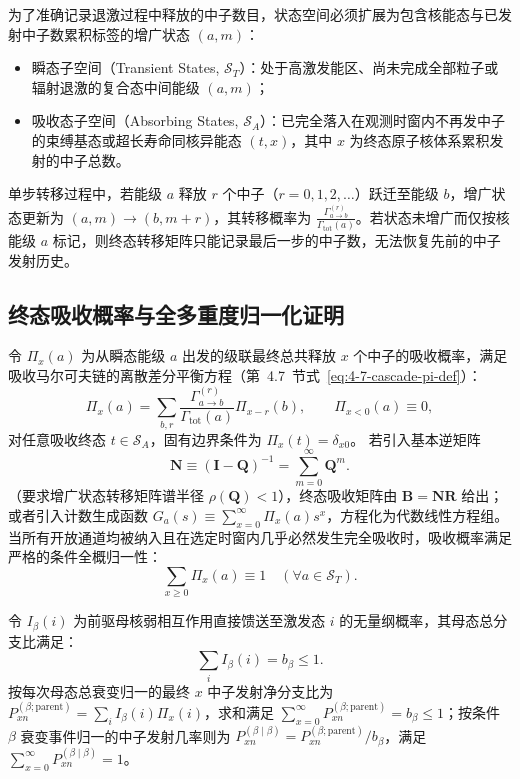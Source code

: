 为了准确记录退激过程中释放的中子数目，状态空间必须扩展为包含核能态与已发射中子数累积标签的增广状态 $(a, m)$：
\begin{itemize}
\item 瞬态子空间（Transient States, $\mathcal{S}_T$）：处于高激发能区、尚未完成全部粒子或辐射退激的复合态中间能级 $(a, m)$；
\item 吸收态子空间（Absorbing States, $\mathcal{S}_A$）：已完全落入在观测时窗内不再发中子的束缚基态或超长寿命同核异能态 $(t, x)$，其中 $x$ 为终态原子核体系累积发射的中子总数。
\end{itemize}
单步转移过程中，若能级 $a$ 释放 $r$ 个中子（$r = 0, 1, 2, \dots$）跃迁至能级 $b$，增广状态更新为 $(a, m) \to (b, m + r)$，其转移概率为 $\frac{\Gamma^{(r)}_{a \to b}}{\Gamma_{\mathrm{tot}}(a)}$。若状态未增广而仅按核能级 $a$ 标记，则终态转移矩阵只能记录最后一步的中子数，无法恢复先前的中子发射历史。

\subsection{终态吸收概率与全多重度归一化证明}

令 $\Pi_x(a)$ 为从瞬态能级 $a$ 出发的级联最终总共释放 $x$ 个中子的吸收概率，满足吸收马尔可夫链的离散差分平衡方程（第~4.7~节式~\eqref{eq:4-7-cascade-pi-def}）：
\begin{equation}\label{eq:appD-pi-balance}
\Pi_x(a) = \sum_{b, r} \frac{\Gamma^{(r)}_{a \to b}}{\Gamma_{\mathrm{tot}}(a)} \Pi_{x-r}(b), \qquad \Pi_{x < 0}(a) \equiv 0,
\end{equation}
对任意吸收终态 $t \in \mathcal{S}_A$，固有边界条件为 $\Pi_x(t) = \delta_{x0}$。
若引入基本逆矩阵
\begin{equation}\label{eq:appD-fundamental-matrix}
\mathbf{N} \equiv (\mathbf{I} - \mathbf{Q})^{-1} = \sum_{m=0}^\infty \mathbf{Q}^m.
\end{equation}
（要求增广状态转移矩阵谱半径 $\rho(\mathbf{Q}) < 1$），终态吸收矩阵由 $\mathbf{B} = \mathbf{N} \mathbf{R}$ 给出；或者引入计数生成函数 $G_a(s) \equiv \sum_{x=0}^\infty \Pi_x(a) s^x$，方程化为代数线性方程组。
当所有开放通道均被纳入且在选定时窗内几乎必然发生完全吸收时，吸收概率满足严格的条件全概归一性：
\begin{equation}\label{eq:appD-pi-sum-unity}
\sum_{x \ge 0} \Pi_x(a) \equiv 1 \quad (\forall a \in \mathcal{S}_T).
\end{equation}

令 $I_\beta(i)$ 为前驱母核弱相互作用直接馈送至激发态 $i$ 的无量纲概率，其母态总分支比满足：
\begin{equation}\label{eq:appD-ibeta-sum}
\sum_{i} I_\beta(i) = b_\beta \le 1.
\end{equation}
按每次母态总衰变归一的最终 $x$ 中子发射净分支比为 $P_{xn}^{(\beta;\mathrm{parent})} = \sum_{i} I_\beta(i) \Pi_x(i)$，求和满足 $\sum_{x=0}^\infty P_{xn}^{(\beta;\mathrm{parent})} = b_\beta \le 1$；按条件 $\beta$ 衰变事件归一的中子发射几率则为 $P_{xn}^{(\beta\mid\beta)} = P_{xn}^{(\beta;\mathrm{parent})} / b_\beta$，满足 $\sum_{x=0}^\infty P_{xn}^{(\beta\mid\beta)} = 1$。

